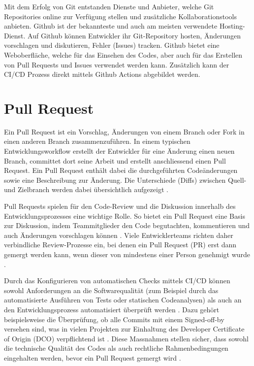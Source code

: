 Mit dem Erfolg von Git entstanden Dienste und Anbieter, welche Git Repositories online zur Verfügung stellen und zusätzliche Kollaborationstools anbieten. Github ist der bekannteste und auch am meisten verwendete Hosting-Dienst. Auf Github können Entwickler ihr Git-Repository hosten, Änderungen vorschlagen und diskutieren, Fehler (Issues) tracken. Github bietet eine Weboberfläche, welche für das Einsehen des Codes, aber auch für das Erstellen von Pull Requests und Issues verwendet werden kann. Zusätzlich kann der CI/CD Prozess direkt mittels Github Actions abgebildet werden. \parencite{noauthor_informationen_2025}  

\section{Pull Request} 
Ein Pull Request ist ein Vorschlag, Änderungen von einem Branch oder Fork in einen anderen Branch zusammenzuführen. In einem typischen Entwicklungsworkflow erstellt der Entwickler für eine Änderung einen neuen Branch, committet dort seine Arbeit und erstellt anschliessend einen Pull Request. Ein Pull Request enthält dabei die durchgeführten Codeänderungen sowie eine Beschreibung zur Änderung. Die Unterschiede (Diffs) zwischen Quell- und Zielbranch werden dabei übersichtlich aufgezeigt \parencite{noauthor_about_nodate}.

Pull Requests spielen für den Code-Review und die Diskussion innerhalb des Entwicklungsprozesses eine wichtige Rolle. So bietet ein Pull Request eine Basis zur Diskussion, indem Teammitglieder den Code begutachten, kommentieren und auch Änderungen vorschlagen können \parencite{atlassian_pull_nodate}. Viele Entwicklerteams richten daher verbindliche Review-Prozesse ein, bei denen ein Pull Request (PR) erst dann gemergt werden kann, wenn dieser von mindestens einer Person genehmigt wurde \parencite{jiang_how_2022}.

Durch das Konfigurieren von automatischen Checks mittels CI/CD können sowohl Anforderungen an die Softwarequalität (zum Beispiel durch das automatisierte Ausführen von Tests oder statischen Codeanalysen) als auch an den Entwicklungsprozess automatisiert überprüft werden \parencite{kinsman_how_2021}. Dazu gehört beispielsweise die Überprüfung, ob alle Commits mit einem Signed-off-by versehen sind, was in vielen Projekten zur Einhaltung des Developer Certificate of Origin (DCO) verpflichtend ist \parencite{holtgrave_attributing_2025}. Diese Massnahmen stellen sicher, dass sowohl die technische Qualität des Codes als auch rechtliche Rahmenbedingungen eingehalten werden, bevor ein Pull Request gemergt wird \parencite{noauthor_about_nodate}. 

